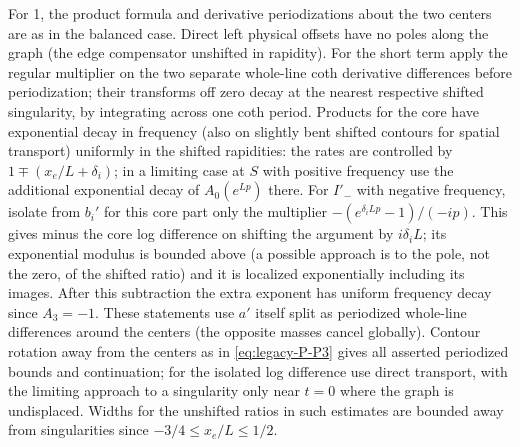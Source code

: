 For 1, the product formula and derivative periodizations about the two centers are as in the balanced case. Direct left physical offsets have no poles along the graph (the edge compensator unshifted in rapidity). For the short term apply the regular multiplier on the two separate whole-line coth derivative differences before periodization; their transforms off zero decay at the nearest respective shifted singularity, by integrating across one coth period. Products for the core have exponential decay in frequency (also on slightly bent shifted contours for spatial transport) uniformly in the shifted rapidities: the rates are controlled by \(1\mp(x_e/L+\delta_i)\); in a limiting case at \(S\) with positive frequency use the additional exponential decay of \(A_0(e^{Lp})\) there. For \(I'_-\) with negative frequency, isolate from \(b_i'\) for this core part only the multiplier \(-(e^{\delta_i Lp}-1)/(-ip)\). This gives minus the core log difference on shifting the argument by \(i\delta_i L\); its exponential modulus is bounded above (a possible approach is to the pole, not the zero, of the shifted ratio) and it is localized exponentially including its images. After this subtraction the extra exponent has uniform frequency decay since \(A_3=-1\). These statements use \(a'\) itself split as periodized whole-line differences around the centers (the opposite masses cancel globally). Contour rotation away from the centers as in \eqref{eq:legacy-P-P3} gives all asserted periodized bounds and continuation; for the isolated log difference use direct transport, with the limiting approach to a singularity only near \(t=0\) where the graph is undisplaced. Widths for the unshifted ratios in such estimates are bounded away from singularities since \(-3/4\le x_e/L\le1/2\).



